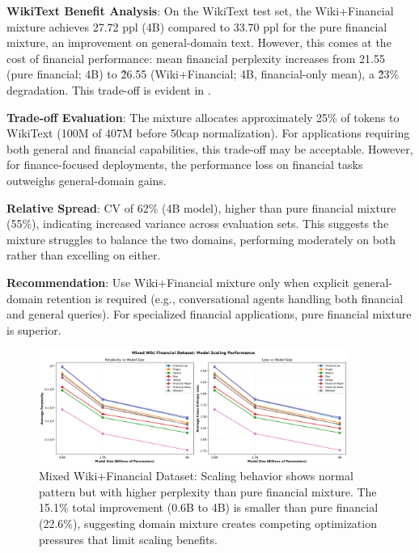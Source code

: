 \textbf{WikiText Benefit Analysis}: On the WikiText test set, the Wiki+Financial mixture achieves 27.72 ppl (4B) compared to 33.70 ppl for the pure financial mixture, an improvement on general-domain text. However, this comes at the cost of financial performance: mean financial perplexity increases from 21.55 (pure financial; 4B) to \~26.55 (Wiki+Financial; 4B, financial-only mean), a \~23\% degradation. This trade-off is evident in .

\textbf{Trade-off Evaluation}: The mixture allocates approximately 25\% of tokens to WikiText (100M of 407M before 50cap normalization). For applications requiring both general and financial capabilities, this trade-off may be acceptable. However, for finance-focused deployments, the performance loss on financial tasks outweighs general-domain gains.

\textbf{Relative Spread}: CV of 62\% (4B model), higher than pure financial mixture (55\%), indicating increased variance across evaluation sets. This suggests the mixture struggles to balance the two domains, performing moderately on both rather than excelling on either.

\textbf{Recommendation}: Use Wiki+Financial mixture only when explicit general-domain retention is required (e.g., conversational agents handling both financial and general queries). For specialized financial applications, pure financial mixture is superior.

\begin{figure}[h]
\centering
\includegraphics[width=0.9\textwidth]{figures/scaling_mixed_wiki_financial.png}
\caption[Mixed Wiki+Financial Dataset: Scaling Behavior]{Mixed Wiki+Financial Dataset: Scaling behavior shows normal pattern but with higher perplexity than pure financial mixture. The 15.1\% total improvement (0.6B to 4B) is smaller than pure financial (22.6\%), suggesting domain mixture creates competing optimization pressures that limit scaling benefits.}
\label{fig:scaling_mixed_wiki_financial}
\end{figure}

